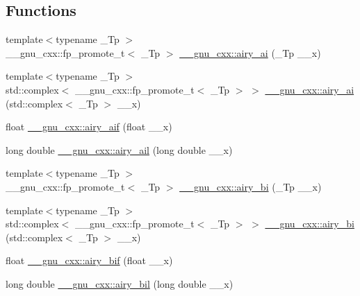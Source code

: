 \subsection*{Functions}
\begin{DoxyCompactItemize}
\item 
{\footnotesize template$<$typename \+\_\+\+Tp $>$ }\\\+\_\+\+\_\+gnu\+\_\+cxx\+::fp\+\_\+promote\+\_\+t$<$ \+\_\+\+Tp $>$ \hyperlink{group__gnu__math__spec__func_gac84f8c4ad00ee677ad4d0b785925d983}{\+\_\+\+\_\+gnu\+\_\+cxx\+::airy\+\_\+ai} (\+\_\+\+Tp \+\_\+\+\_\+x)
\item 
{\footnotesize template$<$typename \+\_\+\+Tp $>$ }\\std\+::complex$<$ \+\_\+\+\_\+gnu\+\_\+cxx\+::fp\+\_\+promote\+\_\+t$<$ \+\_\+\+Tp $>$ $>$ \hyperlink{group__gnu__math__spec__func_gacf37e6c9f186ade270b476c8e5826fb9}{\+\_\+\+\_\+gnu\+\_\+cxx\+::airy\+\_\+ai} (std\+::complex$<$ \+\_\+\+Tp $>$ \+\_\+\+\_\+x)
\item 
float \hyperlink{group__gnu__math__spec__func_gaf317ba724c44b3a8271fe341d9870173}{\+\_\+\+\_\+gnu\+\_\+cxx\+::airy\+\_\+aif} (float \+\_\+\+\_\+x)
\item 
long double \hyperlink{group__gnu__math__spec__func_ga800fdb61c672ae1831f4ca4250d657de}{\+\_\+\+\_\+gnu\+\_\+cxx\+::airy\+\_\+ail} (long double \+\_\+\+\_\+x)
\item 
{\footnotesize template$<$typename \+\_\+\+Tp $>$ }\\\+\_\+\+\_\+gnu\+\_\+cxx\+::fp\+\_\+promote\+\_\+t$<$ \+\_\+\+Tp $>$ \hyperlink{group__gnu__math__spec__func_ga33c172cab7f8e9c99537444c7e30801a}{\+\_\+\+\_\+gnu\+\_\+cxx\+::airy\+\_\+bi} (\+\_\+\+Tp \+\_\+\+\_\+x)
\item 
{\footnotesize template$<$typename \+\_\+\+Tp $>$ }\\std\+::complex$<$ \+\_\+\+\_\+gnu\+\_\+cxx\+::fp\+\_\+promote\+\_\+t$<$ \+\_\+\+Tp $>$ $>$ \hyperlink{group__gnu__math__spec__func_ga27cfc90cf84fae2acb2d55a9409ea49c}{\+\_\+\+\_\+gnu\+\_\+cxx\+::airy\+\_\+bi} (std\+::complex$<$ \+\_\+\+Tp $>$ \+\_\+\+\_\+x)
\item 
float \hyperlink{group__gnu__math__spec__func_ga2ade465827bdba7370abbcce78e54912}{\+\_\+\+\_\+gnu\+\_\+cxx\+::airy\+\_\+bif} (float \+\_\+\+\_\+x)
\item 
long double \hyperlink{group__gnu__math__spec__func_ga59240b3f40177e5187f3f194f624f0f8}{\+\_\+\+\_\+gnu\+\_\+cxx\+::airy\+\_\+bil} (long double \+\_\+\+\_\+x)
\item 

\end{DoxyCompactItemize}
